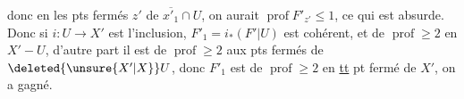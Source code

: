 donc en les pts fermés $z'$ de $\overline{x'_1}\cap U$, on aurait $\operatorname{prof}F'_{z'}\leq 1$, ce qui est absurde. Donc si $i:U\to X'$ est l'inclusion, $F'_1=i_*(F'|U)$ est cohérent, et  de $\operatorname{prof}\geq 2$ en $X'-U$, d'autre part il est de $\operatorname{prof}\geq 2$ aux pts fermés de $\deleted{\unsure{X'|X}}U$, donc $F'_1$ est de $\operatorname{prof}\geq 2$ en \uline{tt} pt fermé de $X'$, on a gagné.
